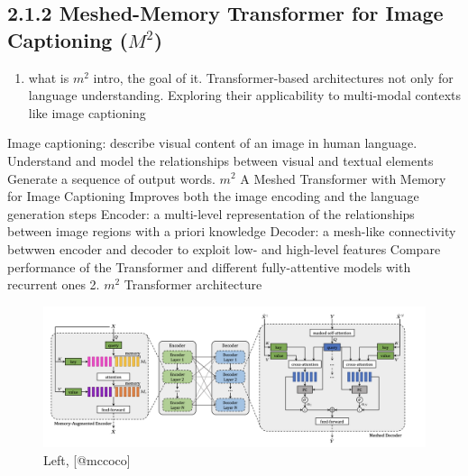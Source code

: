 \documentclass[
]{krantz}
\providecommand{\tightlist}{%
  \setlength{\itemsep}{0pt}\setlength{\parskip}{0pt}}
\begin{document}
\hypertarget{meshed-memory-transformer-for-image-captioning-m2}{%
\subsection{\texorpdfstring{2.1.2 Meshed-Memory Transformer for Image Captioning (\(M^2\))}{2.1.2 Meshed-Memory Transformer for Image Captioning (M\^{}2)}}\label{meshed-memory-transformer-for-image-captioning-m2}}

\begin{enumerate}
\def\labelenumi{\arabic{enumi}.}
\tightlist
\item
  what is \(m^2\) intro, the goal of it.
  Transformer-based architectures not only for language understanding.
  Exploring their applicability to multi-modal contexts like image captioning\citep{cornia2020m2}
\end{enumerate}

Image captioning: describe visual content of an image in human language.
Understand and model the relationships between visual and textual elements
Generate a sequence of output words.
\(m^2\)
A Meshed Transformer with Memory for Image Captioning
Improves both the image encoding and the language generation steps
Encoder: a multi-level representation of the relationships between image regions with a priori knowledge
Decoder: a mesh-like connectivity betwwen encoder and decoder to exploit low- and high-level features
Compare performance of the Transformer and different fully-attentive models with recurrent ones
2. \(m^2\) Transformer architecture \citep{cornia2020m2}

\begin{figure}

{\centering \includegraphics[width=1\linewidth]{figures/02-chapter2/2.1 m2} 

}

\caption{Left, [@mccoco]}\label{fig:unnamed-chunk-4}
\end{figure}
\end{document}
